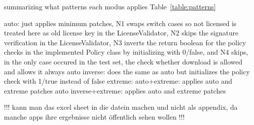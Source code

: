 summarizing what patterns each modus applies Table~\ref{table:patterns}

auto: just applies minimum patches, N1 swaps switch cases so not licensed is treated here as old license key in the LicenseValidator, N2 skips the signature verification in the LicenseValidator, N3 inverts the return boolean for the policy checks in the implemented Policy class by initializing with 0/false, and N4 skips, in the only case occured in the test set, the check whether download is allowed and allows it always
auto inverse: does the same as auto but initializes the policy check with 1/true instead of false
extreme:
auto+extreme: applies auto and extreme patches
auto inverse+extreme: applies auto and extreme patches




!!! kann man das excel sheet in die datein machen und nicht als appendix, da manche apps ihre ergebnisse nicht öffentlich sehen wollen !!!
